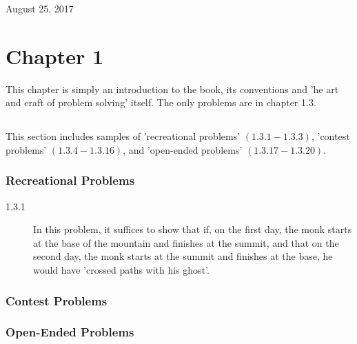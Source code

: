 \documentclass[11pt]{article}
\begin{document}
\begin{titlepage}
	\vspace*{310px}
	
	{\large August 25, 2017} %
	
	
	 
	
	\vfill %
	
\end{titlepage}

\tableofcontents
\newpage

\section{Chapter 1}
\vspace{0.5\baselineskip}
This chapter is simply an introduction to the book, its conventions and 'he art and craft of problem solving' itself. The only problems are in chapter 1.3.
\vspace{\baselineskip}


\subsection{}
This section includes samples of 'recreational problems' $(1.3.1 - 1.3.3)$, 'contest problems' $(1.3.4 - 1.3.16)$, and 'open-ended problems' $(1.3.17 - 1.3.20)$. \vspace{\baselineskip}

\subsubsection*{Recreational Problems}

\begin{description}
	\item[1.3.1] In this problem, it suffices to show that if, on the first day, the monk starts at the base of the mountain and finishes at the summit, and that on the second day, the monk starts at the summit and finishes at the base, he would have 'crossed paths with his ghost'.
\end{description}
\subsubsection*{Contest Problems}
\subsubsection*{Open-Ended Problems}
\end{document}
